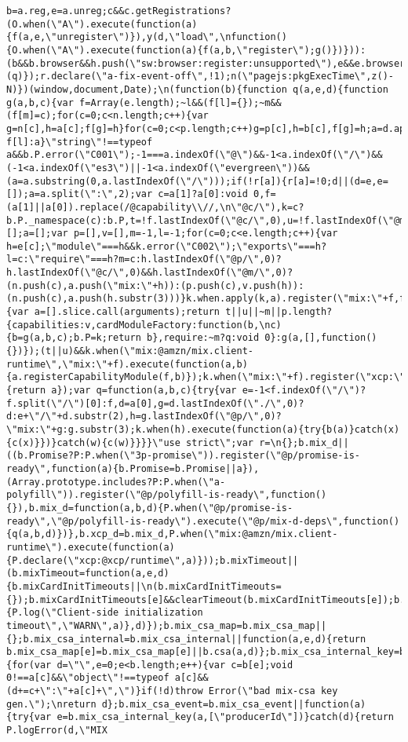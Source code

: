 \documentclass[
]{article}
\begin{document}
\begin{verbatim}
b=a.reg,e=a.unreg;c&&c.getRegistrations?(O.when(\"A\").execute(function(a){f(a,e,\"unregister\")}),y(d,\"load\",\nfunction(){O.when(\"A\").execute(function(a){f(a,b,\"register\");g()})})):(b&&b.browser&&h.push(\"sw:browser:register:unsupported\"),e&&e.browser&&h.push(\"sw:browser:unregister:unsupported\"),g())})(q)});r.declare(\"a-fix-event-off\",!1);n(\"pagejs:pkgExecTime\",z()-N)})(window,document,Date);\n(function(b){function q(a,e,d){function g(a,b,c){var f=Array(e.length);~l&&(f[l]={});~m&&(f[m]=c);for(c=0;c<n.length;c++){var g=n[c],h=a[c];f[g]=h}for(c=0;c<p.length;c++)g=p[c],h=b[c],f[g]=h;a=d.apply(null,f);return~l?f[l]:a}\"string\"!==typeof a&&b.P.error(\"C001\");-1===a.indexOf(\"@\")&&-1<a.indexOf(\"/\")&&(-1<a.indexOf(\"es3\")||-1<a.indexOf(\"evergreen\"))&&(a=a.substring(0,a.lastIndexOf(\"/\")));if(!r[a]){r[a]=!0;d||(d=e,e=[]);a=a.split(\":\",2);var c=a[1]?a[0]:void 0,f=(a[1]||a[0]).replace(/@capability\\//,\n\"@c/\"),k=c?b.P._namespace(c):b.P,t=!f.lastIndexOf(\"@c/\",0),u=!f.lastIndexOf(\"@m/\",0),n=[];a=[];var p=[],v=[],m=-1,l=-1;for(c=0;c<e.length;c++){var h=e[c];\"module\"===h&&k.error(\"C002\");\"exports\"===h?l=c:\"require\"===h?m=c:h.lastIndexOf(\"@p/\",0)?h.lastIndexOf(\"@c/\",0)&&h.lastIndexOf(\"@m/\",0)?(n.push(c),a.push(\"mix:\"+h)):(p.push(c),v.push(h)):(n.push(c),a.push(h.substr(3)))}k.when.apply(k,a).register(\"mix:\"+f,function(){var a=[].slice.call(arguments);return t||u||~m||p.length?{capabilities:v,cardModuleFactory:function(b,\nc){b=g(a,b,c);b.P=k;return b},require:~m?q:void 0}:g(a,[],function(){})});(t||u)&&k.when(\"mix:@amzn/mix.client-runtime\",\"mix:\"+f).execute(function(a,b){a.registerCapabilityModule(f,b)});k.when(\"mix:\"+f).register(\"xcp:\"+f,function(a){return a});var q=function(a,b,c){try{var e=-1<f.indexOf(\"/\")?f.split(\"/\")[0]:f,d=a[0],g=d.lastIndexOf(\"./\",0)?d:e+\"/\"+d.substr(2),h=g.lastIndexOf(\"@p/\",0)?\"mix:\"+g:g.substr(3);k.when(h).execute(function(a){try{b(a)}catch(x){c(x)}})}catch(w){c(w)}}}}\"use strict\";var r=\n{};b.mix_d||((b.Promise?P:P.when(\"3p-promise\")).register(\"@p/promise-is-ready\",function(a){b.Promise=b.Promise||a}),(Array.prototype.includes?P:P.when(\"a-polyfill\")).register(\"@p/polyfill-is-ready\",function(){}),b.mix_d=function(a,b,d){P.when(\"@p/promise-is-ready\",\"@p/polyfill-is-ready\").execute(\"@p/mix-d-deps\",function(){q(a,b,d)})},b.xcp_d=b.mix_d,P.when(\"mix:@amzn/mix.client-runtime\").execute(function(a){P.declare(\"xcp:@xcp/runtime\",a)}));b.mixTimeout||(b.mixTimeout=function(a,e,d){b.mixCardInitTimeouts||\n(b.mixCardInitTimeouts={});b.mixCardInitTimeouts[e]&&clearTimeout(b.mixCardInitTimeouts[e]);b.mixCardInitTimeouts[e]=setTimeout(function(){P.log(\"Client-side initialization timeout\",\"WARN\",a)},d)});b.mix_csa_map=b.mix_csa_map||{};b.mix_csa_internal=b.mix_csa_internal||function(a,e,d){return b.mix_csa_map[e]=b.mix_csa_map[e]||b.csa(a,d)};b.mix_csa_internal_key=b.mix_csa_internal_key||function(a,b){for(var d=\"\",e=0;e<b.length;e++){var c=b[e];void 0!==a[c]&&\"object\"!==typeof a[c]&&(d+=c+\":\"+a[c]+\",\")}if(!d)throw Error(\"bad mix-csa key gen.\");\nreturn d};b.mix_csa_event=b.mix_csa_event||function(a){try{var e=b.mix_csa_internal_key(a,[\"producerId\"])}catch(d){return P.logError(d,\"MIX 
\end{verbatim}
\end{document}
